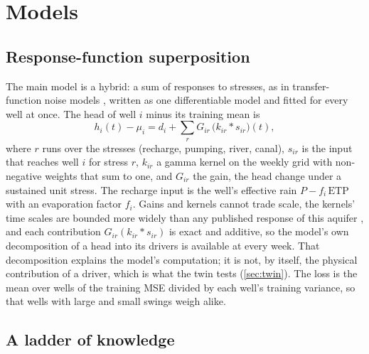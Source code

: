 \section{Models}\label{sec:models}

\subsection{Response-function superposition}\label{sec:response}

The main model is a hybrid: a sum of responses to stresses, as in transfer-function noise models
\citep{Collenteur2019Pastas}, written as one differentiable model and fitted for every well at once.
The head of well $i$ minus its training mean is
\begin{equation}
h_i(t) - \mu_i = d_i + \sum_{r} G_{ir}\,\bigl(k_{ir} * s_{ir}\bigr)(t),
\label{eq:response}
\end{equation}
where $r$ runs over the stresses (recharge, pumping, river, canal), $s_{ir}$ is the input that
reaches well $i$ for stress $r$, $k_{ir}$ a gamma kernel on the weekly grid with non-negative
weights that sum to one, and $G_{ir}$ the gain, the head change under a sustained unit stress. The
recharge input is the well's effective rain $P - f_i\,\mathrm{ETP}$ with an evaporation factor
$f_i$. Gains and kernels cannot trade scale, the kernels' time scales are bounded more widely than
any published response of this aquifer \citep{Caballero2015Impact}, and each contribution
$G_{ir}(k_{ir} * s_{ir})$ is exact and additive, so the model's own decomposition of a head into its
drivers is available at every week. That decomposition explains the model's computation; it is
not, by itself, the physical contribution of a driver, which is what the twin tests
(\cref{sec:twin}). The loss is the mean over wells of the training MSE divided by each well's
training variance, so that wells with large and small swings weigh alike.

\subsection{A ladder of knowledge}\label{sec:ladder}

